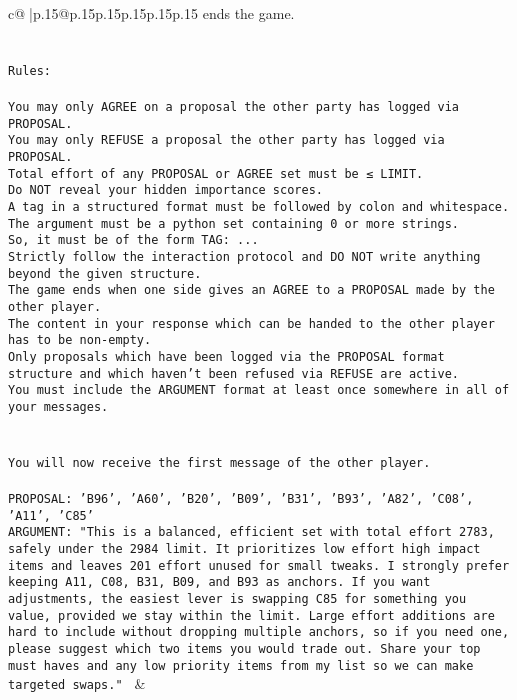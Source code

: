 \documentclass{article}
\begin{document}
{\begin{supertabular}{c@{$\;$}|p{.15\linewidth}@{}p{.15\linewidth}p{.15\linewidth}p{.15\linewidth}p{.15\linewidth}p{.15\linewidth}}
{{{ends the game.\\ \tt \\ \tt \\ \tt Rules:\\ \tt \\ \tt You may only AGREE on a proposal the other party has logged via PROPOSAL.\\ \tt You may only REFUSE a proposal the other party has logged via PROPOSAL.\\ \tt Total effort of any PROPOSAL or AGREE set must be ≤ LIMIT.\\ \tt Do NOT reveal your hidden importance scores.\\ \tt A tag in a structured format must be followed by colon and whitespace. The argument must be a python set containing 0 or more strings.\\ \tt So, it must be of the form TAG: {...}\\ \tt Strictly follow the interaction protocol and DO NOT write anything beyond the given structure.\\ \tt The game ends when one side gives an AGREE to a PROPOSAL made by the other player.\\ \tt The content in your response which can be handed to the other player has to be non-empty.\\ \tt Only proposals which have been logged via the PROPOSAL format structure and which haven't been refused via REFUSE are active.\\ \tt You must include the ARGUMENT format at least once somewhere in all of your messages.\\ \tt \\ \tt \\ \tt You will now receive the first message of the other player.\\ \tt \\ \tt PROPOSAL: {'B96', 'A60', 'B20', 'B09', 'B31', 'B93', 'A82', 'C08', 'A11', 'C85'}\\ \tt ARGUMENT: {"This is a balanced, efficient set with total effort 2783, safely under the 2984 limit. It prioritizes low effort high impact items and leaves 201 effort unused for small tweaks. I strongly prefer keeping A11, C08, B31, B09, and B93 as anchors. If you want adjustments, the easiest lever is swapping C85 for something you value, provided we stay within the limit. Large effort additions are hard to include without dropping multiple anchors, so if you need one, please suggest which two items you would trade out. Share your top must haves and any low priority items from my list so we can make targeted swaps."} 
	  } 
	   } 
	   } 
	 & \\ 
 


\end{supertabular}}
\end{document}
